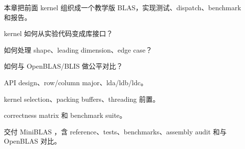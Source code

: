 {本章把前面 kernel 组织成一个教学版 BLAS，实现测试、dispatch、benchmark 和报告。}
{\item kernel 如何从实验代码变成库接口？
\item 如何处理 shape、leading dimension、edge case？
\item 如何与 OpenBLAS/BLIS 做公平对比？}
{\item API design、row/column major、lda/ldb/ldc。
\item kernel selection、packing buffers、threading 前置。
\item correctness matrix 和 benchmark suite。}
{交付 MiniBLAS ，含 reference、tests、benchmarks、assembly audit 和与 OpenBLAS 对比。}

